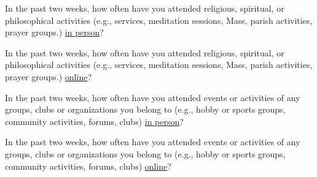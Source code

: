 \documentclass[
  english,
  a4paper,
  sdaps_style=qr,
  checkmode= check
]{sdapsclassic}
\begin{document}
\begin{questionnaire}[noinfo]
\begin{optionquestion}[cols=1, singlechoice, var=bs04a]{In the past two weeks, how often have you attended religious, spiritual, or philosophical activities (e.g., services, meditation sessions, Mass, parish activities, prayer groups.) \underline{in person}?}
\end{optionquestion}

\begin{optionquestion}[cols=1, singlechoice, var=bs04b]{In the past two weeks, how often have you attended religious, spiritual, or philosophical activities (e.g., services, meditation sessions, Mass, parish activities, prayer groups.) \underline{online}?}
\end{optionquestion}

\begin{optionquestion}[cols=1, singlechoice, var=bs05a]{In the past two weeks, how often have you attended events or activities of any groups, clubs or organizations you belong to (e.g., hobby or sports groups, community activities, forums, clubs) \underline{in person}?}
\end{optionquestion}

\begin{optionquestion}[cols=1, singlechoice, var=bs05b]{In the past two weeks, how often have you attended events or activities of any groups, clubs or organizations you belong to (e.g., hobby or sports groups, community activities, forums, clubs) \underline{online}?}
\end{optionquestion}
\end{questionnaire}
\end{document}
